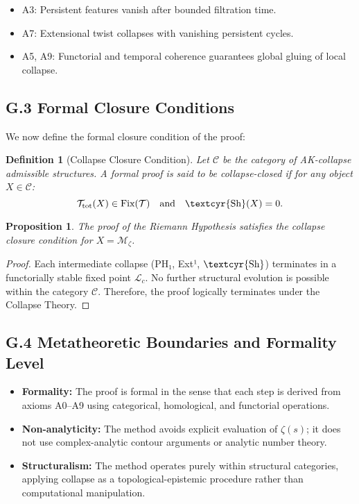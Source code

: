 \documentclass[11pt]{article}
\newtheorem{definition}[theorem]{Definition}
\newtheorem{proposition}[theorem]{Proposition}
\newcommand{\Sha}{\text{\textcyr{Sh}}}
\begin{document}
\begin{itemize}
    \item A3: Persistent features vanish after bounded filtration time.
    \item A7: Extensional twist collapses with vanishing persistent cycles.
    \item A5, A9: Functorial and temporal coherence guarantees global gluing of local collapse.
\end{itemize}

\subsection*{G.3 Formal Closure Conditions}

We now define the formal closure condition of the proof:

\begin{definition}[Collapse Closure Condition]
Let $\mathcal{C}$ be the category of AK-collapse admissible structures.  
A formal proof is said to be \emph{collapse-closed} if for any object $X \in \mathcal{C}$:
\[
\mathcal{T}_{\mathrm{tot}}(X) \in \text{Fix}(\mathcal{T}) \quad \text{and} \quad \Sha(X) = 0.
\]
\end{definition}

\begin{proposition}
The proof of the Riemann Hypothesis satisfies the collapse closure condition for $X = \mathcal{M}_\zeta$.
\end{proposition}

\begin{proof}
Each intermediate collapse (PH₁, Ext¹, $\Sha$) terminates in a functorially stable fixed point $\mathcal{L}_c$.  
No further structural evolution is possible within the category $\mathcal{C}$.  
Therefore, the proof logically terminates under the Collapse Theory.
\end{proof}

\subsection*{G.4 Metatheoretic Boundaries and Formality Level}

\begin{itemize}
    \item \textbf{Formality:} The proof is formal in the sense that each step is derived from axioms A0–A9  
    using categorical, homological, and functorial operations.
    \item \textbf{Non-analyticity:} The method avoids explicit evaluation of $\zeta(s)$;  
    it does not use complex-analytic contour arguments or analytic number theory.
    \item \textbf{Structuralism:} The method operates purely within structural categories,  
    applying collapse as a topological-epistemic procedure rather than computational manipulation.
\end{itemize}
\end{document}
